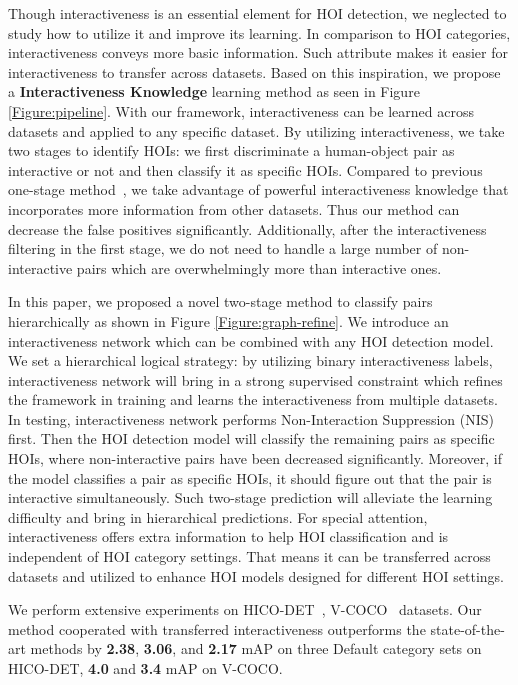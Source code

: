 \documentclass[10pt,twocolumn,letterpaper]{article}
\begin{document}
Though interactiveness is an essential element for HOI detection, we neglected to study how to utilize it and improve its learning. In comparison to HOI categories, interactiveness conveys more basic information. 
Such attribute makes it easier for interactiveness to transfer across datasets. 
Based on this inspiration, we propose a \textbf{Interactiveness Knowledge} learning method as seen in Figure \ref{Figure:pipeline}. 
With our framework, interactiveness can be learned across datasets and applied to any specific dataset.
By utilizing interactiveness, we take two stages to identify HOIs: we first discriminate a human-object pair as interactive or not and then classify it as specific HOIs. 
Compared to previous one-stage method~\cite{hicodet,Gkioxari2017Detecting,gao2018ican,vcoco,qi2018learning}, we take advantage of powerful interactiveness knowledge that incorporates more information from other datasets. Thus our method can decrease the false positives significantly. Additionally, after the interactiveness filtering in the first stage, we do not need to handle a large number of non-interactive pairs which are overwhelmingly more than interactive ones.

In this paper, we proposed a novel two-stage method to classify pairs hierarchically as shown in Figure \ref{Figure:graph-refine}. We introduce an interactiveness network which can be combined with any HOI detection model. We set a hierarchical logical strategy: by utilizing binary interactiveness labels, interactiveness network will bring in a strong supervised constraint which refines the framework in training and learns the interactiveness from multiple datasets. In testing, interactiveness network performs Non-Interaction Suppression (NIS) first. Then the HOI detection model will classify the remaining pairs as specific HOIs, where non-interactive pairs have been decreased significantly. Moreover, if the model classifies a pair as specific HOIs, it should figure out that the pair is interactive simultaneously. Such two-stage prediction will alleviate the learning difficulty and bring in hierarchical predictions. For special attention, interactiveness offers extra information to help HOI classification and is independent of HOI category settings. That means it can be transferred across datasets and utilized to enhance HOI models designed for different HOI settings.

We perform extensive experiments on HICO-DET~\cite{hicodet}, V-COCO~\cite{vcoco} datasets. Our method cooperated with transferred interactiveness outperforms the state-of-the-art methods by \textbf{2.38}, \textbf{3.06}, and \textbf{2.17} mAP on three Default category sets on HICO-DET, \textbf{4.0} and \textbf{3.4} mAP on V-COCO.
\end{document}
